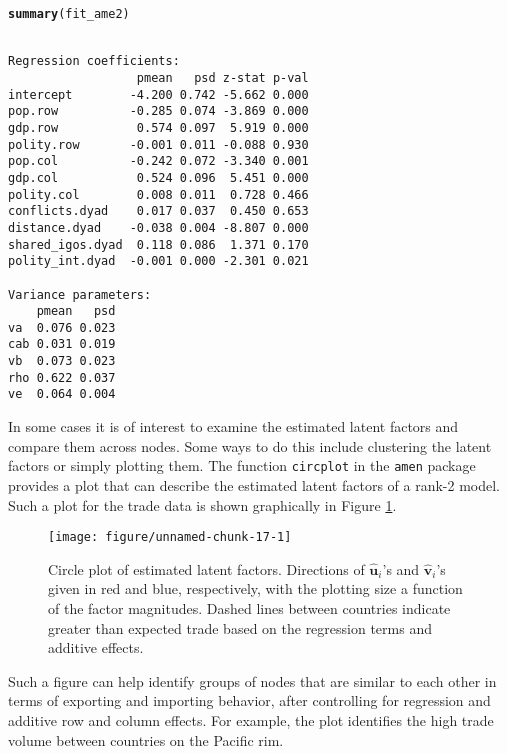 \documentclass[11pt]{article}\usepackage[]{graphicx}\usepackage[]{color}
\makeatletter
\def\maxwidth{ %
  \ifdim\Gin@nat@width>\linewidth
    \linewidth
  \else
    \Gin@nat@width
  \fi
}
\newcommand{\hlstd}[1]{\textcolor[rgb]{0.345,0.345,0.345}{#1}}%
\newcommand{\hlkwd}[1]{\textcolor[rgb]{0.737,0.353,0.396}{\textbf{#1}}}%
\newenvironment{kframe}{%
 \def\at@end@of@kframe{}%
 \ifinner\ifhmode%
  \def\at@end@of@kframe{\end{minipage}}%
  \begin{minipage}{\columnwidth}%
 \fi\fi%
 \def\FrameCommand##1{\hskip\@totalleftmargin \hskip-\fboxsep
 \colorbox{shadecolor}{##1}\hskip-\fboxsep
     \hskip-\linewidth \hskip-\@totalleftmargin \hskip\columnwidth}%
 \MakeFramed {\advance\hsize-\width
   \@totalleftmargin\z@ \linewidth\hsize
   \@setminipage}}%
 {\par\unskip\endMakeFramed%
 \at@end@of@kframe}
\newenvironment{knitrout}{}{} %
\newcommand{\bl}[1]{{\mathbf #1}}
\makeatother
\begin{document}
\begin{knitrout}\footnotesize
{}\color{fgcolor}\begin{kframe}
\begin{alltt}
\hlkwd{summary}\hlstd{(fit_ame2)}
\end{alltt}
\begin{verbatim}

Regression coefficients:
                  pmean   psd z-stat p-val
intercept        -4.200 0.742 -5.662 0.000
pop.row          -0.285 0.074 -3.869 0.000
gdp.row           0.574 0.097  5.919 0.000
polity.row       -0.001 0.011 -0.088 0.930
pop.col          -0.242 0.072 -3.340 0.001
gdp.col           0.524 0.096  5.451 0.000
polity.col        0.008 0.011  0.728 0.466
conflicts.dyad    0.017 0.037  0.450 0.653
distance.dyad    -0.038 0.004 -8.807 0.000
shared_igos.dyad  0.118 0.086  1.371 0.170
polity_int.dyad  -0.001 0.000 -2.301 0.021

Variance parameters:
    pmean   psd
va  0.076 0.023
cab 0.031 0.019
vb  0.073 0.023
rho 0.622 0.037
ve  0.064 0.004
\end{verbatim}
\end{kframe}
\end{knitrout}

In some cases it is of interest to examine the estimated latent factors 
and compare them across nodes. Some ways to do this include clustering the 
latent factors or simply plotting them. The function {\tt circplot} in the 
{\tt amen} package provides a plot that can describe the estimated latent factors 
of a rank-2 model. Such a plot for the trade data is shown graphically in 
Figure \ref{fig:trade_circplot}. 
\begin{figure}
\begin{knitrout}\footnotesize
{}\color{fgcolor}

{\centering \texttt{[image: figure/unnamed-chunk-17-1]} 

}



\end{knitrout}
\caption{Circle plot of estimated latent factors. Directions of 
$\hat {\bl u}_{i}$'s and $\hat {\bl v}_{i}$'s given in red and 
blue, respectively, with the plotting size a function of the 
factor magnitudes.  Dashed lines between countries indicate 
greater than expected trade based on the regression terms 
and additive effects. }
\label{fig:trade_circplot}
\end{figure}
Such a figure can help identify groups of nodes that are similar to each 
other in terms of exporting and importing behavior, after controlling for 
regression and additive row and column effects. 
For example, the plot identifies the high trade volume between countries 
on the Pacific rim. 
\end{document}
